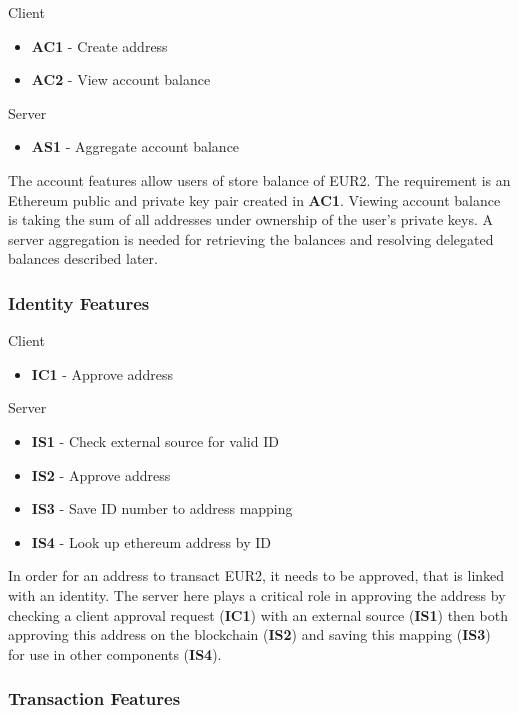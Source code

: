 \documentclass[12pt]{article} %
\begin{document}
{{Client
\begin{itemize}
	\item \textbf{AC1} - Create address
	\item \textbf{AC2} - View account balance
\end{itemize}

Server
\begin{itemize}
	\item \textbf{AS1} - Aggregate account balance
\end{itemize}

The account features allow users of store balance of EUR2. The requirement is an Ethereum public and private key pair created in \textbf{AC1}. Viewing account balance is taking the sum of all addresses under ownership of the user's private keys. A server aggregation is needed for retrieving the balances and resolving delegated balances described later.

\subsubsection{Identity Features} \label{sssec:3.3:identity}

Client
\begin{itemize}
	\item \textbf{IC1} - Approve address
\end{itemize}

Server
\begin{itemize}
	\item \textbf{IS1} - Check external source for valid ID
	\item \textbf{IS2} - Approve address
	\item \textbf{IS3} - Save ID number to address mapping
	\item \textbf{IS4} - Look up ethereum address by ID
\end{itemize}

In order for an address to transact EUR2, it needs to be approved, that is linked with an identity. The server here plays a critical role in approving the address by checking a client approval request (\textbf{IC1}) with an external source (\textbf{IS1}) then both approving this address on the blockchain (\textbf{IS2}) and saving this mapping (\textbf{IS3}) for use in other components (\textbf{IS4}).

\subsubsection{Transaction Features} \label{sssec:3.3:transactions}

}}
\end{document}
